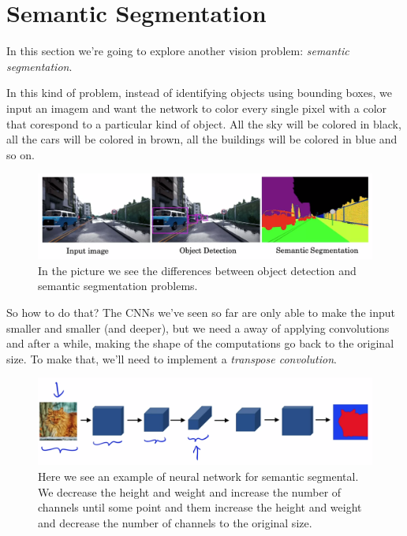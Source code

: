 \documentclass[12pt, a4paper, oneside]{book}
\begin{document}
\section{Semantic Segmentation}%
\label{sec:semantic_segmentation}

In this section we're going to explore another vision problem: \textit{semantic
segmentation}.

In this kind of problem, instead of identifying objects using bounding boxes, we
input an imagem and want the network to color every single pixel with a color
that corespond to a particular kind of object. All the sky will be colored in
black, all the cars will be colored in brown, all the buildings will be colored
in blue and so on.

\begin{figure}[h]
\centering
\includegraphics[scale=0.45]{Res/object_detection_vs_semantic_segmentation.png}
\caption{In the picture we see the differences between object detection and
semantic segmentation problems.}
\label{object_detection_vs_semantic_segmentation.png}
\end{figure}

So how to do that? The CNNs we've seen so far are only able to make the input
smaller and smaller (and deeper), but we need a away of applying convolutions
and after a while, making the shape of the computations go back to the original
size. To make that, we'll need to implement a \textit{transpose convolution}.

\begin{figure}[h]
\centering
\includegraphics[scale=0.45]{Res/nn_for_semantic_segmentation.png}
\caption{Here we see an example of neural network for semantic segmental. We
decrease the height and weight and increase the number of channels until some
point and them increase the height and weight and decrease the number of
channels to the original size.}
\label{nn_for_semantic_segmentation.png}
\end{figure}
\end{document}
